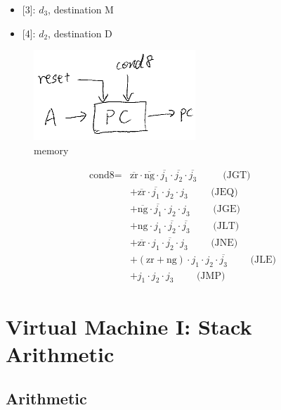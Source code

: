\documentclass[a4paper]{book}
\begin{document}
\begin{itemize}
    \item {}[3]: $d_3$, destination M
    \item {}[4]: $d_2$, destination D
\end{itemize}



\begin{figure}[H]
    \centering
    \includegraphics{pic/project05/cpu3.png}
    \caption{memory}
\end{figure}


\begin{align*}
    \text{cond8} = & \overline{\text{zr}} \cdot \overline{\text{ng}} \cdot \overline{j_1} \cdot \overline{j_2} \cdot \overline{j_3} \text{~~~~~~~ (JGT)} \\
                 & + \overline{\text{zr}} \cdot \overline{j_1} \cdot j_2 \cdot j_3 \text{~~~~~~ (JEQ)} \\
                 & + \overline{\text{ng}} \cdot \overline{j_1} \cdot j_2 \cdot j_3 \text{~~~~~~ (JGE)} \\
                 & + \text{ng} \cdot j_1 \cdot \overline{j_2} \cdot \overline{j_3} \text{~~~~~~ (JLT)} \\
                 & + \overline{\text{zr}} \cdot j_1 \cdot \overline{j_2} \cdot j_3 \text{~~~~~~ (JNE)} \\
                 & + (\text{zr} + \text{ng}) \cdot j_1 \cdot j_2 \cdot \overline{j_3} \text{~~~~~~ (JLE)} \\
                 & + j_1 \cdot j_2 \cdot j_3 \text{~~~~~~ (JMP)}
\end{align*}

 \setcounter{chapter}{6}
\chapter{Virtual Machine I: Stack Arithmetic}
\section{Arithmetic}
\end{document}
